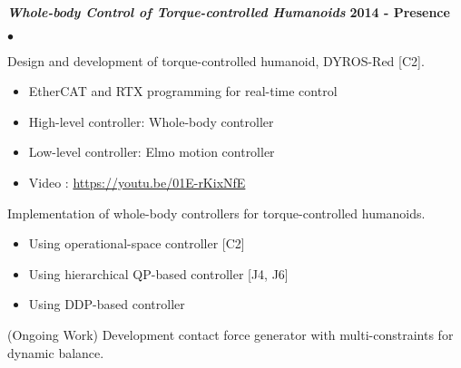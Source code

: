 \documentclass[margin,line]{res}
\newenvironment{list2}{
  \begin{list}{$\bullet$}{%
      \setlength{\itemsep}{0in}
      \setlength{\parsep}{0in} \setlength{\parskip}{0in}
      \setlength{\topsep}{0in} \setlength{\partopsep}{0in} 
      \setlength{\leftmargin}{0.2in}}}{\end{list}}
\begin{document}
\begin{resume}
  \textbf{\emph { Whole-body Control of Torque-controlled Humanoids}} \hfill {\bf 2014 - Presence}
  \begin{list2}
    \item Design and development of torque-controlled humanoid, DYROS-Red [C2].
    \begin{itemize}
      \vspace*{-.05in}
      \item[\checkmark] EtherCAT and RTX programming for real-time control
            \vspace*{-.05in}
      \item[\checkmark] High-level controller: Whole-body controller
            \vspace*{-.05in}
      \item[\checkmark] Low-level controller: Elmo motion controller
            \vspace*{-.05in}
      \item[\checkmark] Video : \url{https://youtu.be/01E-rKixNfE}
            \vspace*{-.05in}
    \end{itemize}
    \item Implementation of whole-body controllers for torque-controlled humanoids.
    \begin{itemize}
      \vspace*{-.05in}
      \item[\checkmark] Using operational-space controller [C2]
            \vspace*{-.05in}
      \item[\checkmark] Using hierarchical QP-based controller [J4, J6]
            \vspace*{-.05in}
      \item[\checkmark] Using DDP-based controller
            \vspace*{-.05in}
    \end{itemize}
    \item (Ongoing Work) Development contact force generator with multi-constraints for dynamic balance.
  \end{list2}


\end{resume}
\end{document}
